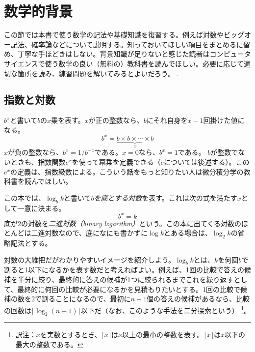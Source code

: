 \section{数学的背景}
この節では本書で使う数学の記法や基礎知識を復習する。例えば対数やビッグオー記法、確率論などについて説明する。知っておいてほしい項目をまとめるに留め、丁寧な手ほどきはしない。背景知識が足りないと感じた読者はコンピュータサイエンスで使う数学の良い（無料の）教科書を読んでほしい。必要に応じて適切な箇所を読み、練習問題を解いてみるとよいだろう。
\cite{llm11}.

\subsection{指数と対数}

$b^x$と書いて$b$の$x$乗を表す。$x$が正の整数なら、$b$にそれ自身を$x-1$回掛けた値になる。
\[
    b^x = \underbrace{b\times b\times \cdots \times b}_{x}
\]
$x$が負の整数なら、$b^x=1/b^{-x}$である。$x=0$なら、$b^x=1$である。
$b$が整数でないときも、指数関数$e^x$を使って冪乗を定義できる（$e$については後述する）。この$e^x$の定義は、指数級数による。こういう話をもっと知りたい人は微分積分学の教科書を読んでほしい。

この本では、$\log_b k$と書いて\emph{$b$を底とする対数}を表す。これは次の式を満たす$x$として一意に決まる。
\[
    b^{x} = k
\]
底が2の対数を\emph{二進対数（binary logarithm）}という。この本に出てくる対数のほとんどは二進対数なので、底になにも書かずに$\log k$とある場合は、$\log_2 k$の省略記法とする。
%
%

対数の大雑把だがわかりやすいイメージを紹介しよう。$\log_b k$とは、$k$を何回$b$で割ると1以下になるかを表す数だと考えればよい。例えば、1回の比較で答えの候補を半分に絞り、最終的に答えの候補が1つに絞られるまでこれを繰り返すとして、最終的に何回の比較が必要になるかを見積もりたいとする。1回の比較で候補の数を$2$で割ることになるので、最初に$n+1$個の答えの候補があるなら、比較の回数は$\lceil \log_2(n+1) \rceil$以下だ（なお、このような手法を二分探索という）%
\footnote{訳注：$x$を実数とするとき、$\lceil x \rceil$は$x$以上の最小の整数を表す。$\lfloor x \rfloor$は$x$以下の最大の整数である。}。

